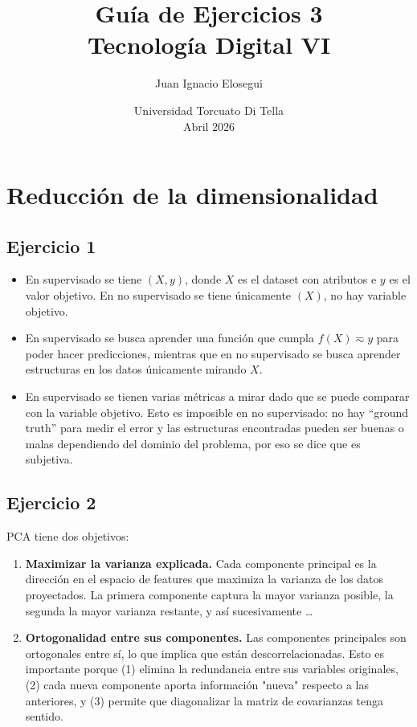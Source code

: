 \documentclass[a4paper,12pt]{article}
\title{\vspace{-2cm}\textbf{Guía de Ejercicios 3}\\[0.2cm]
\large Tecnología Digital VI}
\author{Juan Ignacio Elosegui}
\date{Universidad Torcuato Di Tella \\ Abril 2026}
\begin{document}
\maketitle
\section*{Reducción de la dimensionalidad}
\subsection*{Ejercicio 1}
\begin{itemize}
	\item En supervisado se tiene $ (X,y) $, donde $X$ es el dataset con atributos e $y$ es el valor objetivo. En no supervisado se tiene únicamente $ (X) $, no hay variable objetivo.
	\item En supervisado se busca aprender una función que cumpla $ f(X) \eqsim y $ para poder hacer predicciones, mientras que en no supervisado se busca aprender estructuras en los datos únicamente mirando $X$.
	\item En supervisado se tienen varias métricas a mirar dado que se puede comparar con la variable objetivo. Esto es imposible en no supervisado: no hay ``ground truth'' para medir el error y las estructuras encontradas pueden ser buenas o malas dependiendo del dominio del problema, por eso se dice que es subjetiva.
\end{itemize}
\subsection*{Ejercicio 2}
\noindent PCA tiene dos objetivos:
\begin{enumerate}
	\item \textbf{Maximizar la varianza explicada.} Cada componente principal es la dirección en el espacio de features que maximiza la varianza de los datos proyectados. La primera componente captura la mayor varianza posible, la segunda la mayor varianza restante, y así sucesivamente \dots
	\item \textbf{Ortogonalidad entre sus componentes.} Las componentes principales son ortogonales entre sí, lo que implica que están descorrelacionadas. Esto es importante porque (1) elimina la redundancia entre sus variables originales, (2) cada nueva componente aporta información "nueva" respecto a las anteriores, y (3) permite que diagonalizar la matriz de covarianzas tenga sentido.
\end{enumerate}
\end{document}
